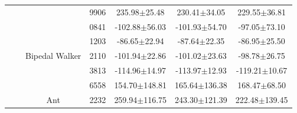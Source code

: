 \begin{table}[t]
\begin{tabular}{ccccccc}
                                    &                       &                                 & 9906        & 235.98$\pm$25.48                                                               & 230.41$\pm$34.05                                                           & 229.55$\pm$36.81                                                           \\ 
        \cline{3-7}
                                    &                       & \multirow{5}{*}{Bipedal Walker} & 0841        & -102.88$\pm$56.03                                                              & -101.93$\pm$54.70                                                          & -97.05$\pm$73.10                                                           \\
                                    &                       &                                 & 1203        & -86.65$\pm$22.94                                                               & -87.64$\pm$22.35                                                           & -86.95$\pm$25.50                                                           \\
                                    &                       &                                 & 2110        & -101.94$\pm$22.86                                                              & -101.02$\pm$23.63                                                          & -98.78$\pm$26.75                                                           \\
                                    &                       &                                 & 3813        & -114.96$\pm$14.97                                                              & -113.97$\pm$12.93                                                          & -119.21$\pm$10.67                                                          \\
                                    &                       &                                 & 6558        & 154.70$\pm$148.81                                                              & 165.64$\pm$136.38                                                          & 168.47$\pm$68.50                                                           \\ 
        \cline{3-7}
                                    &                       & \multirow{5}{*}{Ant}            & 2232        & 259.94$\pm$116.75                                                              & 243.30$\pm$121.39                                                          & 222.48$\pm$139.45                                                          \\

\end{tabular}
\end{table}
